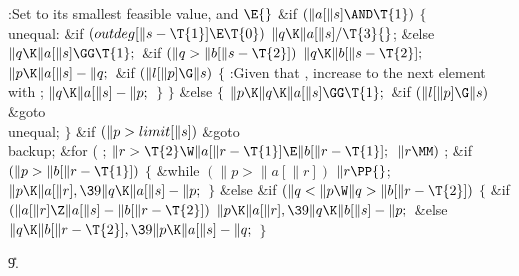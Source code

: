 \Y\B\4:Set  to its smallest feasible value, and \X${}\E{}$\6
\&{if} ${}(\|a[\|s]\AND\T{1}){}$\5
${}\{{}$\1\6
\4\\{unequal}:\5
\&{if} ${}(\\{outdeg}[\|s-\T{1}]\E\T{0}){}$\1\5
${}\|q\K\|a[\|s]/\T{3}{}$;\5
\2\&{else}\1\5
${}\|q\K\|a[\|s]\GG\T{1};{}$\2\6
\&{if} ${}(\|q>\|b[\|s-\T{2}]){}$\1\5
${}\|q\K\|b[\|s-\T{2}];{}$\2\6
${}\|p\K\|a[\|s]-\|q;{}$\6
\&{if} ${}(\|l[\|p]\G\|s){}$\5
${}\{{}$\1\6
:Given that , increase  to the next element with
\X;\6
${}\|q\K\|a[\|s]-\|p;{}$\6
\4${}\}{}$\2\6
\4${}\}{}$\5
\2\&{else}\5
${}\{{}$\1\6
${}\|p\K\|q\K\|a[\|s]\GG\T{1};{}$\6
\&{if} ${}(\|l[\|p]\G\|s){}$\1\5
\&{goto} \\{unequal};\2%
\6
\4${}\}{}$\2\6
\&{if} ${}(\|p>\\{limit}[\|s]){}$\1\5
\&{goto} \\{backup};\2\6
\&{for} ( ; ${}\|r>\T{2}\W\|a[\|r-\T{1}]\E\|b[\|r-\T{1}];{}$ ${}\|r\MM){}$\1\5
;\2\6
\&{if} ${}(\|p>\|b[\|r-\T{1}]){}$\5
${}\{{}$\1\6
\&{while} ${}(\|p>\|a[\|r]){}$\1\5
${}\|r\PP{}$;\2\6
${}\|p\K\|a[\|r],\39\|q\K\|a[\|s]-\|p;{}$\6
\4${}\}{}$\5
\2\&{else} \&{if} ${}(\|q<\|p\W\|q>\|b[\|r-\T{2}]){}$\5
${}\{{}$\1\6
\&{if} ${}(\|a[\|r]\Z\|a[\|s]-\|b[\|r-\T{2}]){}$\1\5
${}\|p\K\|a[\|r],\39\|q\K\|b[\|s]-\|p;{}$\2\6
\&{else}\1\5
${}\|q\K\|b[\|r-\T{2}],\39\|p\K\|a[\|s]-\|q;{}$\2\6
\4${}\}{}$\2\par
\U9.\fi

